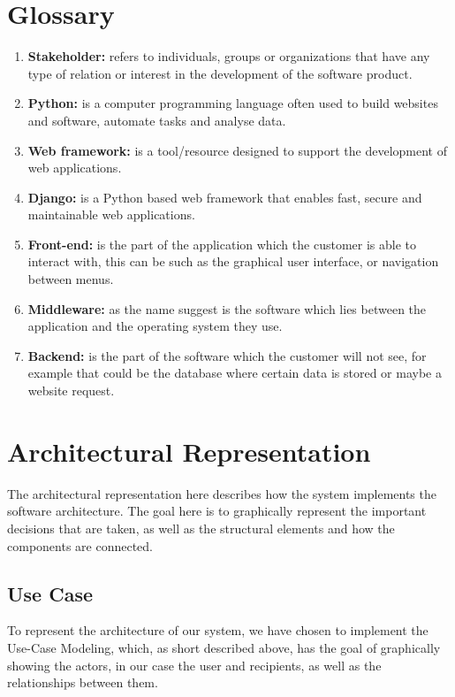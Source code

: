 \documentclass{article}
\begin{document}
\section*{Glossary} 
\begin{enumerate} 
    \item \textbf{Stakeholder:} refers to individuals, groups or organizations that have any type of relation or interest in the development of the software product.
    \item \textbf{Python:} is a computer programming language often used to build websites and software, automate tasks and analyse data. 
    \item \textbf{Web framework:} is a tool/resource designed to support the development of web applications.
    \item \textbf{Django:} is a Python based web framework that enables fast, secure and maintainable web applications. 
    \item \textbf{Front-end:} is the part of the application which the customer is able to interact with, this can be such as the graphical user interface, or navigation between menus.
    \item \textbf{Middleware:} as the name suggest is the software which lies between the application and the operating system they use.
    \item \textbf{Backend:} is the part of the software which the customer will not see, for example that could be the database where certain data is stored or maybe a website request. 
\end{enumerate}

\newpage

\section*{Architectural Representation}

The architectural representation here describes how the system implements the software architecture. The goal here is to graphically represent the important decisions that are taken, as well as the structural elements and how the components are connected.

\subsection*{Use Case}
To represent the architecture of our system, we have chosen to implement the Use-Case Modeling, which, as short described above, has the goal of graphically showing the actors, in our case the user and recipients, as well as the relationships between them.
\end{document}
